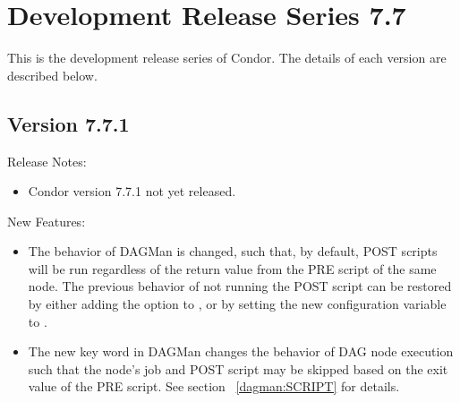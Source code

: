 
\section{\label{sec:History-7-7}Development Release Series 7.7}

This is the development release series of Condor.
The details of each version are described below.

\subsection*{\label{sec:New-7-7-1}Version 7.7.1}

\noindent Release Notes:

\begin{itemize}

\item Condor version 7.7.1 not yet released.

\end{itemize}


\noindent New Features:

\begin{itemize}

\item The behavior of DAGMan is changed, such that, by default,
POST scripts will be run regardless of the return value from the PRE script
of the same node.
The previous behavior of not running the POST script can be restored 
by either adding the  option to ,
or by setting the new configuration variable 
 to .

\item The new  key word in DAGMan changes the
behavior of DAG node execution such that the node's job and POST script
may be skipped based on the exit value of the PRE script.
See section ~\ref{dagman:SCRIPT} for details.


\end{itemize}

